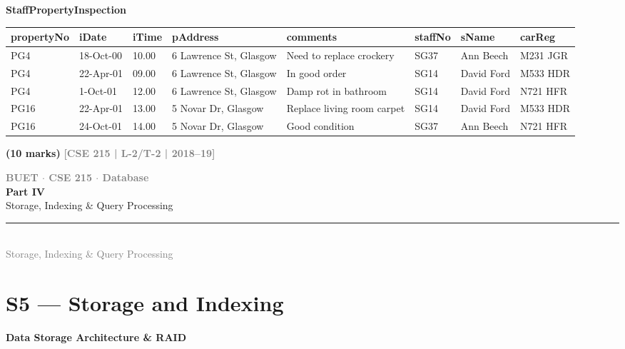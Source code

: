 \documentclass[12pt,a3paper]{article}
\newcommand{\yr}[1]{\hfill\textcolor{gray}{\small\textbf{[#1]}}}
\newcommand{\mk}[1]{\textcolor{orange!70!black}{\small\textbf{(#1 marks)}}}
\newcommand{\subtopic}[2]{%
  \vspace{10pt}
  \noindent\begin{tcolorbox}[colback=#1!8,colframe=#1,boxrule=0.6pt,arc=4pt,
    left=6pt,right=6pt,top=4pt,bottom=4pt]
    \small\bfseries\textcolor{#1}{#2}
  \end{tcolorbox}
  \vspace{2pt}
}
\newcommand{\secdivider}[4]{%
  \newpage\thispagestyle{empty}%
  \vspace*{\fill}%
  \begin{tcolorbox}[enhanced,colback=#4!7,colframe=#3,boxrule=1.5pt,arc=8pt,
    left=20pt,right=20pt,top=22pt,bottom=22pt,
    shadow={3pt}{-3pt}{0pt}{black!15}]
    \centering
    {\large\textcolor{gray}{\textbf{BUET $\cdot$ CSE 215 $\cdot$ Database}}}\\[8pt]
    {\fontsize{26}{32}\selectfont\bfseries\textcolor{#3}{#1}}\\[6pt]
    {\fontsize{15}{19}\selectfont\textcolor{dgray}{#2}}\\[12pt]
    \textcolor{#3!60}{\rule{0.5\textwidth}{0.5pt}}\\[6pt]
    {\small\textcolor{gray}{#2}}
  \end{tcolorbox}%
  \vspace*{\fill}\newpage%
}
\begin{document}
\begin{enumerate}
  \noindent \textbf{StaffPropertyInspection} \\[1ex]
\begin{center}
\renewcommand{\arraystretch}{1.5} %
\begin{tabular}{|l|l|l|p{3.5cm}|p{4cm}|l|l|l|}
\hline
\textbf{propertyNo} & \textbf{iDate} & \textbf{iTime} & \textbf{pAddress} & \textbf{comments} & \textbf{staffNo} & \textbf{sName} & \textbf{carReg} \\
\hline \hline
PG4  & 18-Oct-00 & 10.00 & 6 Lawrence St, Glasgow & Need to replace crockery   & SG37 & Ann Beech  & M231 JGR \\ \hline
PG4  & 22-Apr-01 & 09.00 & 6 Lawrence St, Glasgow & In good order              & SG14 & David Ford & M533 HDR \\ \hline
PG4  & 1-Oct-01  & 12.00 & 6 Lawrence St, Glasgow & Damp rot in bathroom       & SG14 & David Ford & N721 HFR \\ \hline
PG16 & 22-Apr-01 & 13.00 & 5 Novar Dr, Glasgow    & Replace living room carpet & SG14 & David Ford & M533 HDR \\ \hline
PG16 & 24-Oct-01 & 14.00 & 5 Novar Dr, Glasgow    & Good condition             & SG37 & Ann Beech  & N721 HFR \\ 
\hline
\end{tabular}
\end{center}
\mk{10} \yr{CSE 215 | L-2/T-2 | 2018--19}

\end{enumerate}


\secdivider{Part IV}{Storage, Indexing \& Query Processing}{cD}{cD}

\section{S5 --- Storage and Indexing}
\label{sec:S5}

\subtopic{cD}{Data Storage Architecture \& RAID}
\label{sub:s5-storage}
\end{document}
